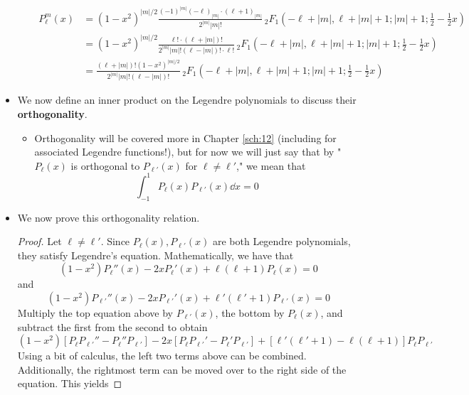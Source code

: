 \documentclass[../finalProject.tex]{subfiles}
\begin{document}
\begin{itemize}
\begin{itemize}
\begin{align*}
            P_\ell^m(x) &= (1-x^2)^{|m|/2}\frac{(-1)^{|m|}(-\ell)_{|m|}\cdot(\ell+1)_{|m|}}{2^{|m|}|m|!}\,{}_2F_1(-\ell+|m|,\ell+|m|+1;|m|+1;\tfrac{1}{2}-\tfrac{1}{2}x)\\
            &= (1-x^2)^{|m|/2}\frac{\ell!\cdot(\ell+|m|)!}{2^{|m|}|m|!(\ell-|m|)!\cdot\ell!}\,{}_2F_1(-\ell+|m|,\ell+|m|+1;|m|+1;\tfrac{1}{2}-\tfrac{1}{2}x)\\
            &= \frac{(\ell+|m|)!(1-x^2)^{|m|/2}}{2^{|m|}|m|!(\ell-|m|)!}\,{}_2F_1(-\ell+|m|,\ell+|m|+1;|m|+1;\tfrac{1}{2}-\tfrac{1}{2}x)
        \end{align*}
    \end{itemize}
    \item We now define an inner product on the Legendre polynomials to discuss their \textbf{orthogonality}.
    \begin{itemize}
        \item Orthogonality will be covered more in Chapter \ref{sch:12} (including for associated Legendre functions!), but for now we will just say that by "$P_\ell(x)$ is orthogonal to $P_{\ell'}(x)$ for $\ell\neq\ell'$," we mean that
        \begin{equation*}
            \int_{-1}^1P_\ell(x)P_{\ell'}(x)\dd{x} = 0\tag{$\ell\neq\ell'$}
        \end{equation*}
    \end{itemize}
    \item We now prove this orthogonality relation.
    \begin{proof}
        Let $\ell\neq\ell'$. Since $P_\ell(x),P_{\ell'}(x)$ are both Legendre polynomials, they satisfy Legendre's equation. Mathematically, we have that
        \begin{equation*}
            (1-x^2)P_\ell''(x)-2xP_\ell'(x)+\ell(\ell+1)P_\ell(x) = 0
        \end{equation*}
        and
        \begin{equation*}
            (1-x^2)P_{\ell'}''(x)-2xP_{\ell'}'(x)+\ell'(\ell'+1)P_{\ell'}(x) = 0
        \end{equation*}
        Multiply the top equation above by $P_{\ell'}(x)$, the bottom by $P_\ell(x)$, and subtract the first from the second to obtain
        \begin{equation*}
            (1-x^2)[P_\ell P_{\ell'}''-P_\ell''P_{\ell'}]-2x[P_\ell P_{\ell'}'-P_\ell'P_{\ell'}]+[\ell'(\ell'+1)-\ell(\ell+1)]P_\ell P_{\ell'}
        \end{equation*}
        Using a bit of calculus, the left two terms above can be combined. Additionally, the rightmost term can be moved over to the right side of the equation. This yields

\end{proof}
\end{itemize}
\end{document}
